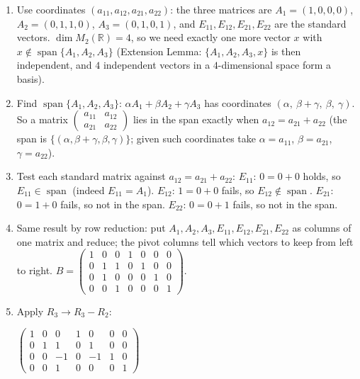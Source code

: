 \documentclass[11pt]{article}
\begin{document}
\begin{tcolorbox}[breakable,colback=ans,colframe=ansb,boxrule=0.5pt,left=4pt,right=4pt,top=2pt,bottom=2pt]\begin{enumerate}[leftmargin=3.1em,itemsep=1pt,topsep=1pt,label=\textbf{Step \arabic*.}]\item Use coordinates $(a_{11},a_{12},a_{21},a_{22})$: the three matrices are $A_1=(1,0,0,0)$, $A_2=(0,1,1,0)$, $A_3=(0,1,0,1)$, and $E_{11},E_{12},E_{21},E_{22}$ are the standard vectors. $\dim M_2(\mathbb{R})=4$, so we need exactly one more vector $x$ with $x\notin\operatorname{span}\{A_1,A_2,A_3\}$ (Extension Lemma: $\{A_1,A_2,A_3,x\}$ is then independent, and $4$ independent vectors in a $4$-dimensional space form a basis).
\item Find $\operatorname{span}\{A_1,A_2,A_3\}$: $\alpha A_1+\beta A_2+\gamma A_3$ has coordinates $(\alpha,\ \beta+\gamma,\ \beta,\ \gamma)$. So a matrix $\begin{pmatrix}a_{11}&a_{12}\\a_{21}&a_{22}\end{pmatrix}$ lies in the span exactly when $a_{12}=a_{21}+a_{22}$ (the span is $\{(\alpha,\beta+\gamma,\beta,\gamma)\}$; given such coordinates take $\alpha=a_{11}$, $\beta=a_{21}$, $\gamma=a_{22}$).
\item Test each standard matrix against $a_{12}=a_{21}+a_{22}$: $E_{11}$: $0=0+0$ holds, so $E_{11}\in\operatorname{span}$ (indeed $E_{11}=A_1$). $E_{12}$: $1=0+0$ fails, so $E_{12}\notin\operatorname{span}$. $E_{21}$: $0=1+0$ fails, so not in the span. $E_{22}$: $0=0+1$ fails, so not in the span.
\item Same result by row reduction: put $A_1,A_2,A_3,E_{11},E_{12},E_{21},E_{22}$ as columns of one matrix and reduce; the pivot columns tell which vectors to keep from left to right. $B=\left(\begin{array}{ccc|cccc}1 & 0 & 0 & 1 & 0 & 0 & 0 \\ 0 & 1 & 1 & 0 & 1 & 0 & 0 \\ 0 & 1 & 0 & 0 & 0 & 1 & 0 \\ 0 & 0 & 1 & 0 & 0 & 0 & 1\end{array}\right)$.
\item Apply $R_3\to R_3-R_2$:\par\smallskip $\displaystyle \left(\begin{array}{ccc|cccc}1 & 0 & 0 & 1 & 0 & 0 & 0 \\ 0 & 1 & 1 & 0 & 1 & 0 & 0 \\ 0 & 0 & -1 & 0 & -1 & 1 & 0 \\ 0 & 0 & 1 & 0 & 0 & 0 & 1\end{array}\right)$

\end{enumerate}
\end{tcolorbox}
\end{document}
